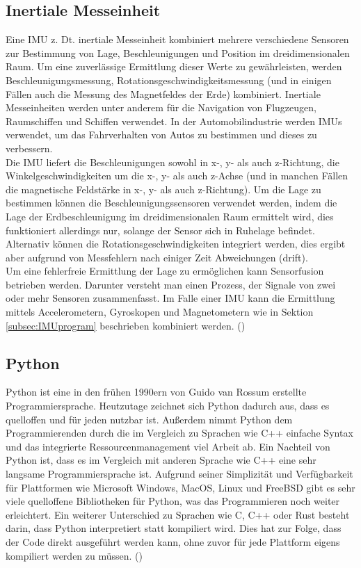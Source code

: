 \subsection{Inertiale Messeinheit}
\label{subsec:tIMU}
Eine \ac{IMU} z. Dt. inertiale Messeinheit kombiniert mehrere verschiedene Sensoren zur Bestimmung von Lage, Beschleunigungen und Position im dreidimensionalen Raum. Um eine zuverlässige Ermittlung dieser Werte zu gewährleisten, werden Beschleunigungsmessung, Rotationsgeschwindigkeitsmessung (und in einigen Fällen auch die Messung des Magnetfeldes der Erde) kombiniert. Inertiale Messeinheiten werden unter anderem für die Navigation von Flugzeugen, Raumschiffen und Schiffen verwendet. In der Automobilindustrie werden \ac{IMU}s verwendet, um das Fahrverhalten von Autos zu bestimmen und dieses zu verbessern.\\
Die \ac{IMU} liefert die Beschleunigungen sowohl in x-, y- als auch z-Richtung, die Winkelgeschwindigkeiten um die x-, y- als auch z-Achse (und in manchen Fällen die magnetische Feldstärke in x-, y- als auch z-Richtung). Um die Lage zu bestimmen können die Beschleunigungssensoren verwendet werden, indem die Lage der Erdbeschleunigung im dreidimensionalen Raum ermittelt wird, dies funktioniert allerdings nur, solange der Sensor sich in Ruhelage befindet. Alternativ können die Rotationsgeschwindigkeiten integriert werden, dies ergibt aber aufgrund von Messfehlern nach einiger Zeit Abweichungen (drift).\\ Um eine fehlerfreie Ermittlung der Lage zu ermöglichen kann Sensorfusion betrieben werden. Darunter versteht man einen Prozess, der Signale von zwei oder mehr Sensoren zusammenfasst. Im Falle einer \ac{IMU} kann die Ermittlung mittels Accelerometern, Gyroskopen und Magnetometern wie in Sektion \ref{subsec:IMUprogram} beschrieben kombiniert werden.
(\cite{UCAM-CL-TR-696})

\subsection{Python}
\label{subsec:tPython}
Python ist eine in den frühen 1990ern von Guido van Rossum erstellte Programmiersprache. Heutzutage zeichnet sich Python dadurch aus, dass es quelloffen und für jeden nutzbar ist. Außerdem nimmt Python dem Programmierenden durch die im Vergleich zu Sprachen wie C++ einfache Syntax und das integrierte Ressourcenmanagement viel Arbeit ab. Ein Nachteil von Python ist, dass es im Vergleich mit anderen Sprache wie C++ eine sehr langsame Programmiersprache ist. Aufgrund seiner Simplizität und Verfügbarkeit für Plattformen wie Microsoft Windows, MacOS, Linux und FreeBSD gibt es sehr viele quelloffene Bibliotheken für Python, was das Programmieren noch weiter erleichtert. Ein weiterer Unterschied zu Sprachen wie C, C++ oder Rust besteht darin, dass Python interpretiert statt kompiliert wird. Dies hat zur Folge, dass der Code direkt ausgeführt werden kann, ohne zuvor für jede Plattform eigens kompiliert werden zu müssen.
(\cite{matthes-2019})